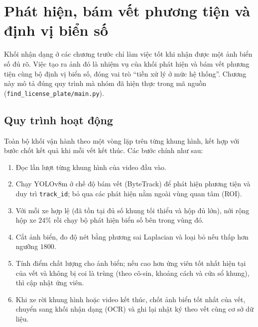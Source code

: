 \documentclass[12pt,a4paper]{report}
\begin{document}
\chapter{Phát hiện, bám vết phương tiện và định vị biển số}

Khối nhận dạng ở các chương trước chỉ làm việc tốt khi nhận được một ảnh biển số đủ rõ. Việc tạo ra ảnh đó là nhiệm vụ của khối phát hiện và bám vết phương tiện cùng bộ định vị biển số, đóng vai trò ``tiền xử lý ở mức hệ thống''. Chương này mô tả đúng quy trình mà nhóm đã hiện thực trong mã nguồn (\texttt{find\_license\_plate/main.py}).

\section{Quy trình hoạt động}
Toàn bộ khối vận hành theo một vòng lặp trên từng khung hình, kết hợp với bước chốt kết quả khi mỗi vết kết thúc. Các bước chính như sau:
\begin{enumerate}[leftmargin=*]
  \item Đọc lần lượt từng khung hình của video đầu vào.
  \item Chạy YOLOv8m ở chế độ bám vết (ByteTrack) để phát hiện phương tiện và duy trì \texttt{track\_id}; bỏ qua các phát hiện nằm ngoài vùng quan tâm (ROI).
  \item Với mỗi xe hợp lệ (đã tồn tại đủ số khung tối thiểu và hộp đủ lớn), nới rộng hộp xe $24\%$ rồi chạy bộ phát hiện biển số bên trong vùng đó.
  \item Cắt ảnh biển, đo độ nét bằng phương sai Laplacian và loại bỏ nếu thấp hơn ngưỡng $1800$.
  \item Tính điểm chất lượng cho ảnh biển; nếu cao hơn ứng viên tốt nhất hiện tại của vết và không bị coi là trùng (theo cô-sin, khoảng cách và cửa sổ khung), thì cập nhật ứng viên.
  \item Khi xe rời khung hình hoặc video kết thúc, chốt ảnh biển tốt nhất của vết, chuyển sang khối nhận dạng (OCR) và ghi lại nhật ký theo vết cùng cơ sở dữ liệu.
\end{enumerate}
\end{document}
